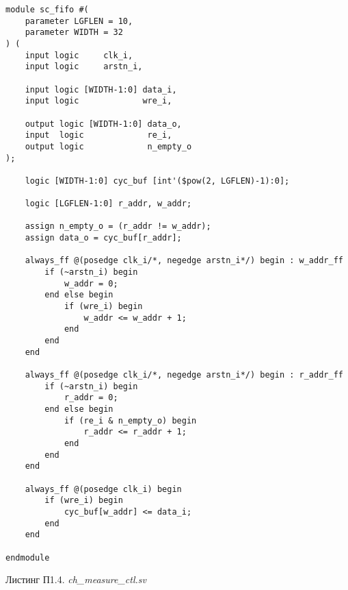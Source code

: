 \begin{lstlisting}
module sc_fifo #(
    parameter LGFLEN = 10,
    parameter WIDTH = 32
) (
    input logic     clk_i,
    input logic     arstn_i,

    input logic [WIDTH-1:0] data_i,
    input logic             wre_i,

    output logic [WIDTH-1:0] data_o,
    input  logic             re_i,
    output logic             n_empty_o
);

    logic [WIDTH-1:0] cyc_buf [int'($pow(2, LGFLEN)-1):0];

    logic [LGFLEN-1:0] r_addr, w_addr;

    assign n_empty_o = (r_addr != w_addr);
    assign data_o = cyc_buf[r_addr];

    always_ff @(posedge clk_i/*, negedge arstn_i*/) begin : w_addr_ff
        if (~arstn_i) begin
            w_addr = 0;
        end else begin
            if (wre_i) begin
                w_addr <= w_addr + 1;
            end
        end
    end

    always_ff @(posedge clk_i/*, negedge arstn_i*/) begin : r_addr_ff
        if (~arstn_i) begin
            r_addr = 0;
        end else begin
            if (re_i & n_empty_o) begin
                r_addr <= r_addr + 1;
            end
        end
    end

    always_ff @(posedge clk_i) begin
        if (wre_i) begin
            cyc_buf[w_addr] <= data_i;
        end
    end

endmodule
\end{lstlisting}

\begin{flushright}
Листинг П1.4. \emph{ch\_measure\_ctl.sv}
\end{flushright}

